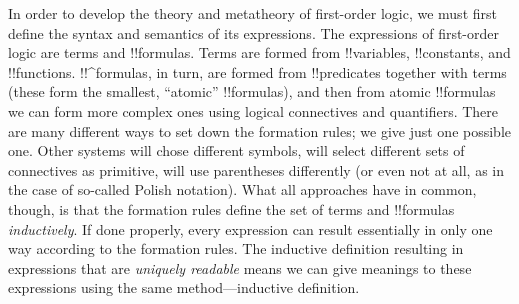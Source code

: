 \documentclass[../../../include/open-logic-section]{subfiles}
\begin{document}

In order to develop the theory and metatheory of first-order logic, we
must first define the syntax and semantics of its expressions.  The
expressions of first-order logic are terms and !!{formula}s.  Terms
are formed from !!{variable}s, !!{constant}s, and !!{function}s.
!!^{formula}s, in turn, are formed from !!{predicate}s together with
terms (these form the smallest, ``atomic'' !!{formula}s), and then
from atomic !!{formula}s we can form more complex ones using logical
connectives and quantifiers.  There are many different ways to set
down the formation rules; we give just one possible one. Other systems
will chose different symbols, will select different sets of
connectives as primitive, will use parentheses differently (or even not
at all, as in the case of so-called Polish notation).  What all
approaches have in common, though, is that the formation rules define
the set of terms and !!{formula}s \emph{inductively}. If done
properly, every expression can result essentially in only one way
according to the formation rules.  The inductive definition resulting
in expressions that are \emph{uniquely readable} means we can give
meanings to these expressions using the same method---inductive
definition.
\end{document}
